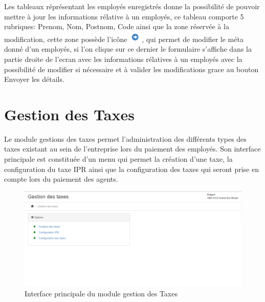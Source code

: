 \documentclass[12pt,a4paper]{report}
\begin{document}
Les tableaux réprésentant les employés enregistrés donne la possibilité de pouvoir mettre à jour les informations rélative à un employés, ce tableau comporte 5 rubriques: Prenom, Nom, Postnom, Code ainsi que la zone réservée à la modification, cette zone possède l'icône \includegraphics[scale=0.7]{pic/PlusUpdate.png}, qui permet de modifier le méta donné d'un employés, si l'on clique sur ce dernier le formulaire s'affiche dans la partie droite de l'ecran avec les informations rélatives à un employés avec la possibilité de modifier si nécessaire et à valider les modifications grace au bouton Envoyer les détails.

\section{Gestion des Taxes}
Le module gestions des taxes permet l'administration des différents types des taxes existant au sein de l'entreprise lors du paiement des employés. Son interface principale est constituée d'un menu qui permet la création d'une taxe, la configuration du taxe IPR ainsi que la configuration des taxes qui seront prise en compte lors du paiement des agents.
\begin{figure}[h]
\begin{center}
\includegraphics[width=14cm]{pic/GesTaxes.png}
\end{center}
\caption{Interface principale du module gestion des Taxes}
\label{Interface principale du module gestion des Taxes}
\end{figure}
\end{document}
